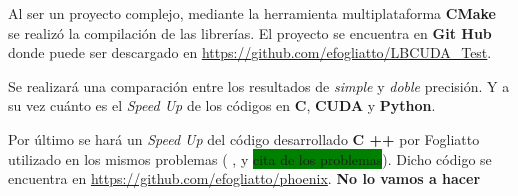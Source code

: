 Al ser un proyecto complejo, mediante la herramienta multiplataforma \textbf{CMake} se realizó la compilación de las librerías. El proyecto se encuentra en \textbf{Git Hub} donde puede ser descargado en \url{ https://github.com/efogliatto/LBCUDA_Test}.

Se realizará una comparación entre los resultados de \textit{simple} y \textit{doble} precisión. Y a su vez cuánto es el \textit{Speed Up} de los códigos en \textbf{C}, \textbf{CUDA} y \textbf{Python}. 

Por último se hará un \textit{Speed Up} del código desarrollado \textbf{C ++} por Fogliatto utilizado en los mismos problemas ( \cite{fogliatto2018modelado}, \cite{fogliatto2019simulation} y \colorbox{green}{cita de los problemas}). Dicho código se encuentra en \url{https://github.com/efogliatto/phoenix}. \textbf{No lo vamos a hacer}



